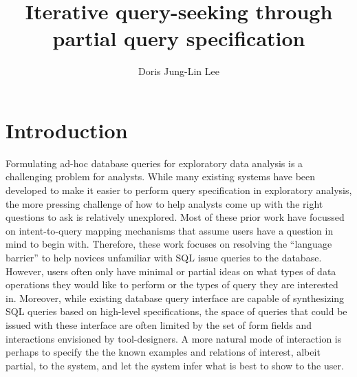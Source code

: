 \documentclass{sig-alternate-05-2015}
\def\plaintitle{Iterative query-seeking through partial query specification}
\def\plainauthor{Doris Jung-Lin Lee}
\begin{document}

%
\title{\plaintitle}
\author{\plainauthor}
\maketitle
\section{Introduction}
Formulating ad-hoc database queries for exploratory data analysis is a challenging problem for analysts. %
While many existing systems have been developed to make it easier to perform query specification in exploratory analysis\cite{Khoussainova2010,Nandi2013,Wu2013,Vartak2015,Abouzied2012,Jiang2015}, the more pressing challenge of how to help analysts come up with the right questions to ask is relatively unexplored. Most of these prior work have focussed on intent-to-query mapping mechanisms that assume users have a question in mind to begin with. Therefore, these work focuses on resolving the ``language barrier'' to help novices unfamiliar with SQL issue queries to the database. However, users often only have minimal or partial ideas on what types of data operations they would like to perform or the types of query they are interested in.  Moreover, while existing database query interface are capable of synthesizing SQL queries based on high-level specifications, the space of queries that could be issued with these interface are often limited by the set of form fields and interactions envisioned by tool-designers. A more natural mode of interaction is perhaps to specify the the known examples and relations of interest, albeit partial, to the system, and let the system infer what is best to show to the user.
\end{document}
